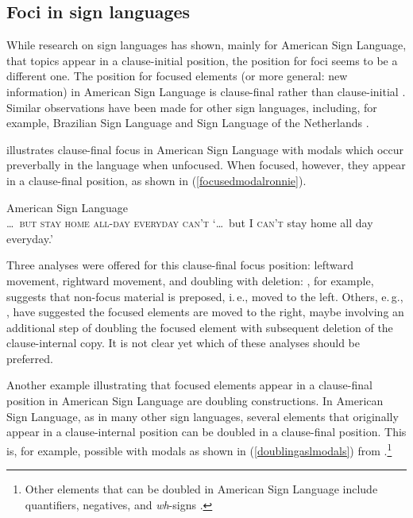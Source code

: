 % 



\subsection{Foci in sign languages}
While research on sign languages has shown, mainly for American Sign Language, that topics appear in a clause-initial position, the position for foci seems to be a different one. The position for focused elements (or more general: new information) in American Sign Language is clause-final rather than clause-initial \citep{wilbur1991intonation, wilbur1994foregrounding, wilbur1996evidence, wilbur1997prosodic}. Similar observations have been made for other sign languages, including, for example, Brazilian Sign Language \citep{de1999phrase} and Sign Language of the Netherlands \citep{crasbornkoijiros2012}. 

\citet[92]{wilbur1997prosodic} illustrates clause-final focus in American Sign Language with modals which occur preverbally in the language when unfocused. When focused, however, they appear in a clause-final position, as shown in (\ref{focusedmodalronnie}).

\begin{exe}
\ex American Sign Language \citep[92]{wilbur1997prosodic} \\ %
{\textsc{\dots\ but stay home all-day everyday can't}}
\glt `\dots\ but I \textsc{can't} stay home all day everyday.' \label{focusedmodalronnie}
\end{exe}

\noindent Three analyses were offered for this clause-final focus position: leftward movement, rightward movement, and  doubling with deletion: \citet{wilbur1997prosodic}, for example, suggests that non-focus material is preposed, i.\,e., moved to the left. Others, e.\,g., \citet{petronio1993clause}, have suggested the focused elements are moved to the right, maybe involving an additional step of doubling the focused element with subsequent deletion of the clause-internal copy. It is not clear yet which of these analyses should be preferred.  

Another example illustrating that focused elements appear in a clause-final position in American Sign Language are doubling constructions. In American Sign Language, as in many other sign languages, several elements that originally appear in a clause-internal position can be doubled in a clause-final position. This is, for example, possible with modals as shown in (\ref{doublingaslmodals}) from \citet[135]{petronio1993clause}.\footnote{ Other elements that can be doubled in American Sign Language include quantifiers, negatives, and \textit{wh}-signs \citep{petronio1993clause}.}

